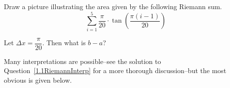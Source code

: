 \begin{question}
Draw a picture illustrating the area given by the following Riemann sum.
\[\sum_{i=1}^5 \frac{\pi}{20}\cdot \tan\left(\frac{\pi (i-1)}{20}\right)\]
\end{question}
\begin{hint}
Let $\Delta x = \dfrac{\pi}{20}$. Then what is $b-a$?
\end{hint}
\begin{answer}
Many interpretations are possible--see the solution to Question~\ref{1.1RiemannInterp} for a more thorough discussion--but the most obvious is given below.

\begin{center}
\end{center}

\end{answer}
